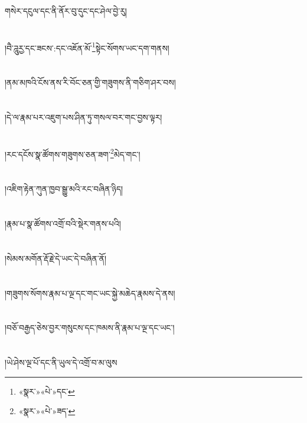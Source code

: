 གསེར་དངུལ་དང་ནི་ནོར་བུ་དུང་དང་ཤེལ་བྱེ་རུ།\chapter{ }།བཻ་ཌཱུརྱ་དང་ཟངས་:དང་འཇོན་མོ་\footnote{«སྣར་»«པེ་»དང་}སྟེང་སོགས་ཡང་དག་གནས།\chapter{ }།ནམ་མཁའི་ངོས་ནས་རི་བོང་ཅན་གྱི་གཟུགས་ནི་གཅིག་ཤར་བས།\chapter{ }།དེ་ལ་རྣམ་པར་འཇུག་པས་ཤིན་ཏུ་གསལ་བར་གང་བྱས་ལྟར།\chapter{ }།རང་དངོས་སྣ་ཚོགས་གཟུགས་ཅན་ཟག་\footnote{«སྣར་»«པེ་»ཟད་}མེད་གང་།\chapter{ }།འཇིག་རྟེན་ཀུན་ཁྱབ་སྒྱུ་མའི་རང་བཞིན་ཉིད།\chapter{ }།རྣམ་པ་སྣ་ཚོགས་འགྲོ་བའི་སྡེར་གནས་པའི།\chapter{ }།སེམས་མགོན་རྡོ་རྗེ་དེ་ཡང་དེ་བཞིན་ནོ།\chapter{ }།གཟུགས་སོགས་རྣམ་པ་ལྔ་དང་གང་ཡང་སྐྱེ་མཆེད་རྣམས་དེ་ནས།\chapter{ }།བཅོ་བརྒྱད་ཅེས་བྱར་གསུངས་དང་ཁམས་ནི་རྣམ་པ་ལྔ་དང་ཡང་།\chapter{ }།ཡེ་ཤེས་ལྔ་པོ་དང་ནི་ཡུལ་དེ་འགྲོ་བ་མ་ལུས